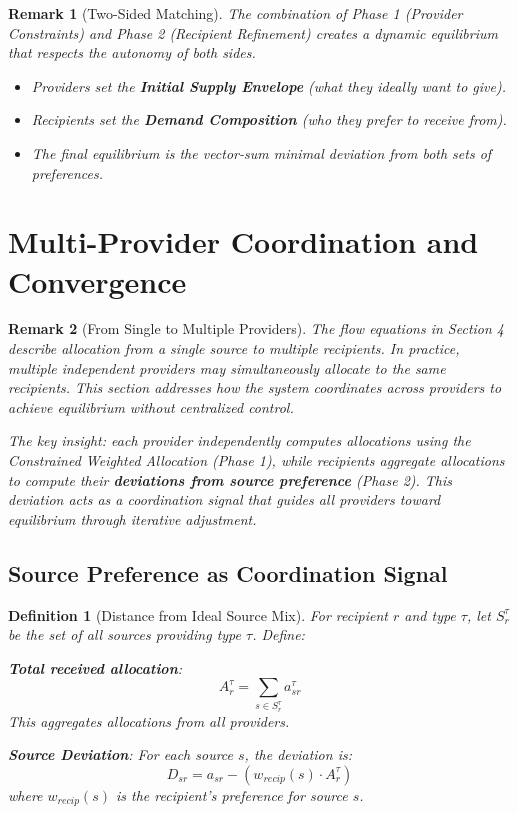 \documentclass[11pt]{article}
\newtheorem{definition}{Definition}
\newtheorem{remark}{Remark}
\begin{document}
\begin{remark}[Two-Sided Matching]
The combination of Phase 1 (Provider Constraints) and Phase 2 (Recipient Refinement) creates a dynamic equilibrium that respects the autonomy of both sides.
\begin{itemize}
   \item Providers set the \textbf{Initial Supply Envelope} (what they ideally want to give).
   \item Recipients set the \textbf{Demand Composition} (who they prefer to receive from).
   \item The final equilibrium is the vector-sum minimal deviation from both sets of preferences.
\end{itemize}
\end{remark}

\section{Multi-Provider Coordination and Convergence}

\begin{remark}[From Single to Multiple Providers]
The flow equations in Section 4 describe allocation from a single source to multiple recipients. In practice, multiple independent providers may simultaneously allocate to the same recipients. This section addresses how the system coordinates across providers to achieve equilibrium without centralized control.

The key insight: each provider independently computes allocations using the Constrained Weighted Allocation (Phase 1), while recipients aggregate allocations to compute their \textbf{deviations from source preference} (Phase 2). This deviation acts as a coordination signal that guides all providers toward equilibrium through iterative adjustment.
\end{remark}

\subsection{Source Preference as Coordination Signal}

\begin{definition}[Distance from Ideal Source Mix]
For recipient $r$ and type $\tau$, let $S_r^\tau$ be the set of all sources providing type $\tau$. Define:

\textbf{Total received allocation}:
\[
A_r^\tau = \sum_{s \in S_r^\tau} a_{sr}^\tau
\]
This aggregates allocations from all providers.

\textbf{Source Deviation}:
For each source $s$, the deviation is:
\[
D_{sr} = a_{sr} - (w_{recip}(s) \cdot A_r^\tau)
\]
where $w_{recip}(s)$ is the recipient's preference for source $s$.
\end{definition}
\end{document}
